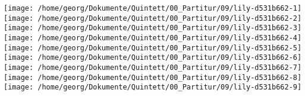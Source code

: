 \texttt{[image: /home/georg/Dokumente/Quintett/00\_Partitur/09/lily-d531b662-1]}%
\ifx\betweenLilyPondSystem \undefined
  \linebreak
\else
  \expandafter{}%
\fi
\texttt{[image: /home/georg/Dokumente/Quintett/00\_Partitur/09/lily-d531b662-2]}%
\ifx\betweenLilyPondSystem \undefined
  \linebreak
\else
  \expandafter{}%
\fi
\texttt{[image: /home/georg/Dokumente/Quintett/00\_Partitur/09/lily-d531b662-3]}%
\ifx\betweenLilyPondSystem \undefined
  \linebreak
\else
  \expandafter{}%
\fi
\texttt{[image: /home/georg/Dokumente/Quintett/00\_Partitur/09/lily-d531b662-4]}%
\ifx\betweenLilyPondSystem \undefined
  \linebreak
\else
  \expandafter{}%
\fi
\texttt{[image: /home/georg/Dokumente/Quintett/00\_Partitur/09/lily-d531b662-5]}%
\ifx\betweenLilyPondSystem \undefined
  \linebreak
\else
  \expandafter{}%
\fi
\texttt{[image: /home/georg/Dokumente/Quintett/00\_Partitur/09/lily-d531b662-6]}%
\ifx\betweenLilyPondSystem \undefined
  \linebreak
\else
  \expandafter{}%
\fi
\texttt{[image: /home/georg/Dokumente/Quintett/00\_Partitur/09/lily-d531b662-7]}%
\ifx\betweenLilyPondSystem \undefined
  \linebreak
\else
  \expandafter{}%
\fi
\texttt{[image: /home/georg/Dokumente/Quintett/00\_Partitur/09/lily-d531b662-8]}%
\ifx\betweenLilyPondSystem \undefined
  \linebreak
\else
  \expandafter{}%
\fi
\texttt{[image: /home/georg/Dokumente/Quintett/00\_Partitur/09/lily-d531b662-9]}%
